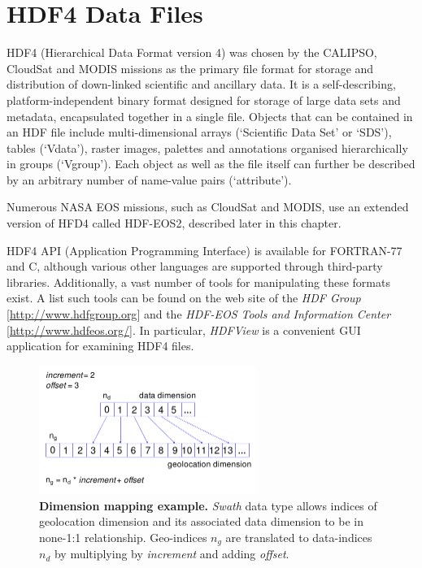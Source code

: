 \chapter{HDF4 Data Files}
HDF4 (Hierarchical Data Format version 4) was chosen by the CALIPSO, CloudSat
and MODIS missions as the primary file format for storage and distribution of
down-linked scientific and ancillary data. It is a self-describing,
platform-independent binary format designed for storage of large data sets and
metadata, encapsulated together in a single file. Objects that can be contained
in an HDF file include multi-dimensional arrays (`Scientific Data Set' or
`SDS'), tables (`Vdata'), raster images, palettes and
annotations organised hierarchically in groups (`Vgroup'). Each object as
well as the file itself can further be described by an arbitrary number of
name-value pairs (`attribute').

Numerous NASA EOS missions, such as CloudSat and MODIS, use an extended version
of HFD4 called HDF-EOS2, described later in this chapter.

HDF4 API (Application Programming Interface) is available
for FORTRAN-77 and C, although various other languages are supported through
third-party libraries. Additionally, a vast number of tools for manipulating
these formats exist. A list such tools can be found on the web site of the \textit{HDF Group}
[\url{http://www.hdfgroup.org}] and the \textit{HDF-EOS Tools and
Information Center} [\url{http://www.hdfeos.org/}]. In particular,
\textit{HDFView} is
a convenient GUI application for examining HDF4 files.

\begin{figure}[h]
\includegraphics[width=200pt]{images/dimension-mapping.pdf}
\caption[Dimension mapping example]{\textbf{Dimension mapping example.} \textit{Swath} data type allows
indices of
geolocation dimension and its associated data dimension to be in none-1:1
relationship. Geo-indices $n_g$ are translated to data-indices $n_d$ by
multiplying by \textit{increment} and adding \textit{offset}.}
\label{fig:dimension-mapping}
\end{figure}


